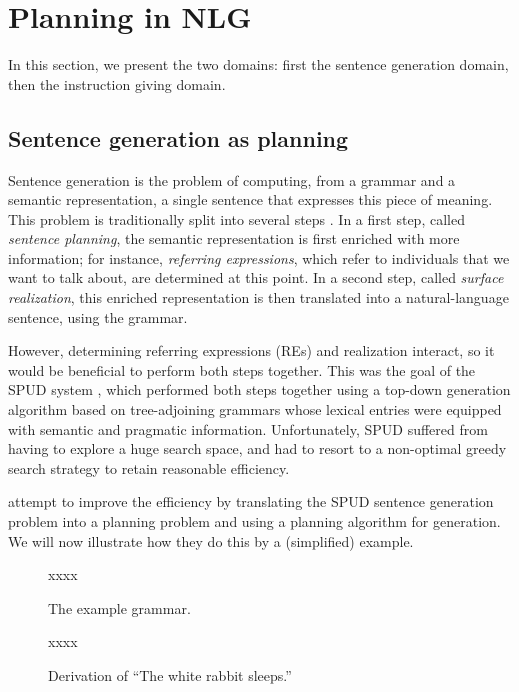 \section{Planning in NLG} \label{sec:domains}

In this section, we present the two domains: first the sentence
generation domain, then the instruction giving domain.


\subsection{Sentence generation as planning}

Sentence generation is the problem of computing, from a grammar and a
semantic representation, a single sentence that expresses this piece
of meaning.  This problem is traditionally split into several steps
\cite{reiter00building}.  In a first step, called \emph{sentence
  planning}, the semantic representation is first enriched with more
information; for instance, \emph{referring expressions}, which refer
to individuals that we want to talk about, are determined at this
point.  In a second step, called \emph{surface realization}, this
enriched representation is then translated into a natural-language
sentence, using the grammar.

However, determining referring expressions (REs) and realization
interact, so it would be beneficial to perform both steps together.
This was the goal of the SPUD system \cite{Stone2003a}, which
performed both steps together using a top-down generation algorithm
based on tree-adjoining grammars \cite{joshi;etal1997} whose lexical
entries were equipped with semantic and pragmatic information.
Unfortunately, SPUD suffered from having to explore a huge search
space, and had to resort to a non-optimal greedy search strategy to
retain reasonable efficiency.

\cite{KolSto07} attempt to improve the efficiency by translating the
SPUD sentence generation problem into a planning problem and using a
planning algorithm for generation.  We will now illustrate how they do
this by a (simplified) example.

\begin{figure}
  \centering
  xxxx
  \caption{The example grammar.}
  \label{fig:white-rabbit-sleeps-grammar}
\end{figure}

\begin{figure}
  \centering
  xxxx
  \caption{Derivation of ``The white rabbit sleeps.''}
  \label{fig:white-rabbit-sleeps-deriv}
\end{figure}

